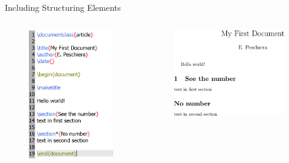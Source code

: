 \begin{frame}[fragile]{Including Structuring Elements}
	\begin{columns}[t]
		\begin{column}{.5\textwidth}
			\begin{figure}
			\includegraphics[scale=.5]{Figures/code1}
			\end{figure}
		\end{column}
		\begin{column}{.5\textwidth}
			\begin{figure}
			\includegraphics[width=.79\linewidth, frame, trim={-1cm -1cm -1cm -1cm},clip]{Figures/doc2}
			\end{figure}
		\end{column}
	\end{columns}	
\end{frame}
